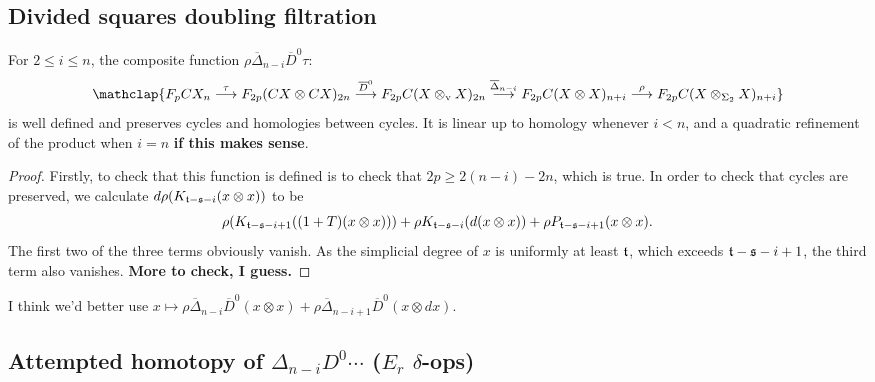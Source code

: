 \documentclass[10pt]{article}
\begin{document}
\begin{Adams sseq operations}
\subsection{Divided squares doubling filtration}
{\tiny\begin{prop}
For $2\leq i\leq n$, the composite function $\rho\overline{\Delta}_{n-i}\overline{D}^0\tau$:
\[\mathclap{F_p CX_{n}\overset{\tau}{\to} F_{2p}(CX\otimes CX)_{2n}\overset{\overline{D}^0}{\to}F_{2p}C(X\otimes_\textup{v} X)_{2n}\overset{\overline{\Delta}_{n-i}}{\to}F_{2p}C(X\otimes X)_{n+i}\overset{\rho}{\to}F_{2p}C(X\otimes_{\Sigma_2} X)_{n+i}}\]
is well defined and preserves cycles and homologies between cycles. It is linear up to homology whenever $i<n$, and a quadratic refinement of the product when $i=n$ \textbf{if this makes sense}.
\end{prop}
\begin{proof}
Firstly, to check that this function is defined is to check that $2p\geq2(n-i)-2n$, which is true. In order to check that cycles are preserved, we calculate $d\rho(K_{\mathfrak{t}-\mathfrak{s}-i}(x\otimes x))$ to be
\[\rho(K_{\mathfrak{t}-\mathfrak{s}-i+1}((1+T)(x\otimes x)))+\rho K_{\mathfrak{t}-\mathfrak{s}-i}(d(x\otimes x))+\rho P_{\mathfrak{t}-\mathfrak{s}-i+1}(x\otimes x).\]
The first two of the three terms obviously vanish. As the simplicial degree of $x$ is uniformly at least $\mathfrak{t}$, which exceeds $\mathfrak{t}-\mathfrak{s}-i+1$, the third term also vanishes.
\textbf{More to check, I guess.}
\end{proof}}
I think we'd better use $x\mapsto\rho\overline{\Delta}_{n-i}\overline{D}^0(x\otimes x)+\rho\overline{\Delta}_{n-i+1}\overline{D}^0(x\otimes dx)$.
\subsection{Attempted homotopy of $\Delta_{n-i} D^{0}\cdots$ ($E_r$ $\delta$-ops)}


\end{Adams sseq operations}
\end{document}
